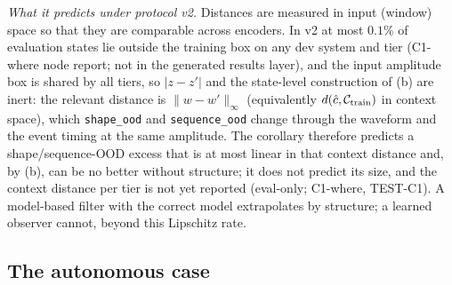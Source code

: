 \noindent\emph{What it predicts under protocol v2.} Distances are measured in input (window) space so that they are
comparable across encoders. In v2 at most $0.1\%$ of evaluation states lie outside the training box on any dev system
and tier (C1-where node report; not in the generated results layer), and the
input amplitude box is shared by all tiers, so $|z-z'|$ and the state-level construction of (b) are inert: the relevant
distance is $\|w-w'\|_\infty$ (equivalently $d(\hat c,\mathcal C_{\rm train})$ in context space), which \texttt{shape\_ood}
and \texttt{sequence\_ood} change through the waveform and the event timing at the same amplitude. The corollary therefore
predicts a shape/sequence-OOD excess that is at most linear in that context distance and, by (b), can be no better
without structure; it does not predict its size, and the context distance per tier is not yet reported (eval-only; C1-where,
TEST-C1). A model-based filter with the correct model extrapolates by structure; a learned observer cannot, beyond this
Lipschitz rate.

\subsection{The autonomous case}

